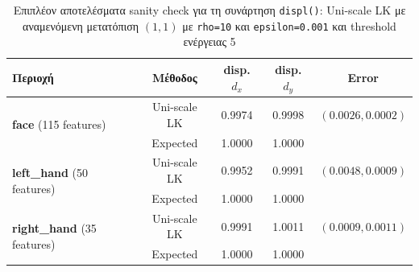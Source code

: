 \documentclass[12pt, a4paper]{article}
\begin{document}
\begin{table}[H]
\centering
\setlength{\tabcolsep}{6pt}
\begin{tabular}{lcccc}
\toprule
\textbf{Περιοχή} & \textbf{Μέθοδος} & \textbf{disp. $d_x$} & \textbf{disp. $d_y$} & \textbf{Error} \\
\midrule
\multirow{2}{*}{\textbf{face} (115 features)} & Uni-scale LK & 0.9974 & 0.9998 & $(0.0026, 0.0002)$ \\
 & Expected & 1.0000 & 1.0000 & \\
\midrule
\multirow{2}{*}{\textbf{left\_hand} (50 features)} & Uni-scale LK & 0.9952 & 0.9991 & $(0.0048, 0.0009)$ \\
 & Expected & 1.0000 & 1.0000 & \\
\midrule
\multirow{2}{*}{\textbf{right\_hand} (35 features)} & Uni-scale LK & 0.9991 & 1.0011 & $(0.0009, 0.0011)$ \\
 & Expected & 1.0000 & 1.0000 & \\
\bottomrule
\end{tabular}
\caption{Επιπλέον αποτελέσματα sanity check για τη συνάρτηση \texttt{displ()}: Uni-scale LK με αναμενόμενη μετατόπιση $(1, 1)$ με \texttt{rho=10} και \texttt{epsilon=0.001} και threshold ενέργειας 5}
\label{table:displ_sanity_check_2}
\end{table}
\end{document}
